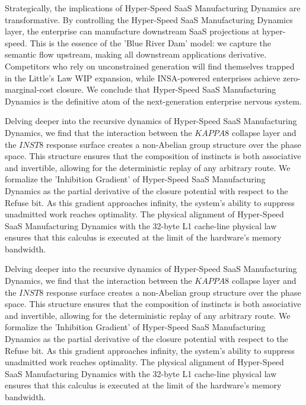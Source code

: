 \documentclass[12pt,a4paper,oneside]{book}
\begin{document}
Strategically, the implications of Hyper-Speed SaaS Manufacturing Dynamics are transformative. By controlling the Hyper-Speed SaaS Manufacturing Dynamics layer, the enterprise can manufacture downstream SaaS projections at hyper-speed. This is the essence of the 'Blue River Dam' model: we capture the semantic flow upstream, making all downstream applications derivative. Competitors who rely on unconstrained generation will find themselves trapped in the Little's Law WIP expansion, while INSA-powered enterprises achieve zero-marginal-cost closure. We conclude that Hyper-Speed SaaS Manufacturing Dynamics is the definitive atom of the next-generation enterprise nervous system. 

Delving deeper into the recursive dynamics of Hyper-Speed SaaS Manufacturing Dynamics, we find that the interaction between the $KAPPA8$ collapse layer and the $INST8$ response surface creates a non-Abelian group structure over the phase space. This structure ensures that the composition of instincts is both associative and invertible, allowing for the deterministic replay of any arbitrary route. We formalize the 'Inhibition Gradient' of Hyper-Speed SaaS Manufacturing Dynamics as the partial derivative of the closure potential with respect to the Refuse bit. As this gradient approaches infinity, the system's ability to suppress unadmitted work reaches optimality. The physical alignment of Hyper-Speed SaaS Manufacturing Dynamics with the 32-byte L1 cache-line physical law ensures that this calculus is executed at the limit of the hardware's memory bandwidth. 

Delving deeper into the recursive dynamics of Hyper-Speed SaaS Manufacturing Dynamics, we find that the interaction between the $KAPPA8$ collapse layer and the $INST8$ response surface creates a non-Abelian group structure over the phase space. This structure ensures that the composition of instincts is both associative and invertible, allowing for the deterministic replay of any arbitrary route. We formalize the 'Inhibition Gradient' of Hyper-Speed SaaS Manufacturing Dynamics as the partial derivative of the closure potential with respect to the Refuse bit. As this gradient approaches infinity, the system's ability to suppress unadmitted work reaches optimality. The physical alignment of Hyper-Speed SaaS Manufacturing Dynamics with the 32-byte L1 cache-line physical law ensures that this calculus is executed at the limit of the hardware's memory bandwidth. 
\end{document}
